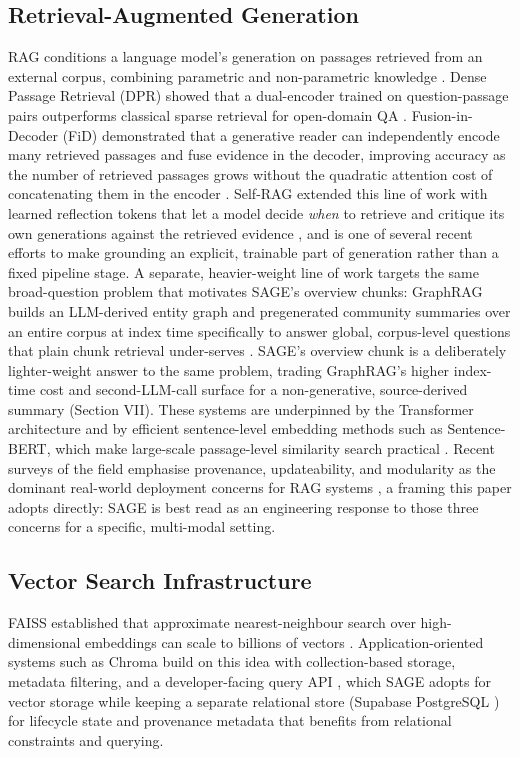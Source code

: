 \documentclass[conference]{IEEEtran}
\begin{document}
\subsection{Retrieval-Augmented Generation}
RAG conditions a language model's generation on passages retrieved from
an external corpus, combining parametric and non-parametric knowledge
\cite{lewis2020rag}. Dense Passage Retrieval (DPR) showed that a
dual-encoder trained on question-passage pairs outperforms classical
sparse retrieval for open-domain QA \cite{karpukhin2020dpr}. Fusion-in-Decoder
(FiD) demonstrated that a generative reader can independently encode
many retrieved passages and fuse evidence in the decoder, improving
accuracy as the number of retrieved passages grows without the
quadratic attention cost of concatenating them in the encoder
\cite{izacard2021fid}. Self-RAG extended this line of work with
learned reflection tokens that let a model decide \emph{when} to
retrieve and critique its own generations against the retrieved evidence
\cite{asai2024selfrag}, and is one of several recent efforts to make
grounding an explicit, trainable part of generation rather than a fixed
pipeline stage. A separate, heavier-weight line of work targets the same
broad-question problem that motivates SAGE's overview chunks: GraphRAG
builds an LLM-derived entity graph and pregenerated community summaries
over an entire corpus at index time specifically to answer global,
corpus-level questions that plain chunk retrieval under-serves
\cite{edge2024graphrag}. SAGE's overview chunk is a deliberately
lighter-weight answer to the same problem, trading GraphRAG's
higher index-time cost and second-LLM-call surface for a
non-generative, source-derived summary (Section VII). These systems are underpinned by the Transformer
architecture \cite{vaswani2017attention} and by efficient sentence-level
embedding methods such as Sentence-BERT, which make large-scale
passage-level similarity search practical \cite{reimers2019sbert}.
Recent surveys of the field emphasise provenance, updateability, and
modularity as the dominant real-world deployment concerns for RAG
systems \cite{gao2023ragsurvey}, a framing this paper adopts directly:
SAGE is best read as an engineering response to those three concerns
for a specific, multi-modal setting.

\subsection{Vector Search Infrastructure}
FAISS established that approximate nearest-neighbour search over
high-dimensional embeddings can scale to billions of vectors
\cite{johnson2017faiss}. Application-oriented systems such as Chroma
build on this idea with collection-based storage, metadata filtering,
and a developer-facing query API \cite{chroma2026docs}, which SAGE
adopts for vector storage while keeping a separate relational store
(Supabase PostgreSQL \cite{supabase2026docs}) for lifecycle state and
provenance metadata that benefits from relational constraints and
querying.
\end{document}
